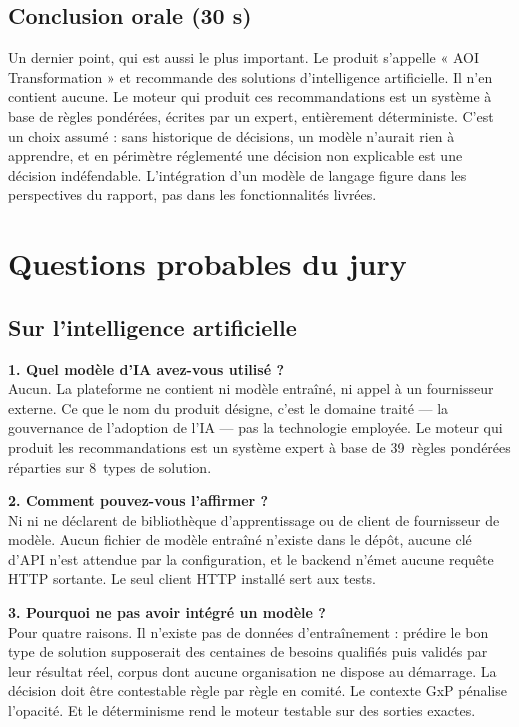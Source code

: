 \subsection*{Conclusion orale (30 s)}

\begin{oral}
Un dernier point, qui est aussi le plus important. Le produit s'appelle « AOI
Transformation » et recommande des solutions d'intelligence artificielle. Il n'en
contient aucune. Le moteur qui produit ces recommandations est un système à base de
règles pondérées, écrites par un expert, entièrement déterministe. C'est un choix
assumé : sans historique de décisions, un modèle n'aurait rien à apprendre, et en
périmètre réglementé une décision non explicable est une décision indéfendable.
L'intégration d'un modèle de langage figure dans les perspectives du rapport, pas dans
les fonctionnalités livrées.
\end{oral}

\section{Questions probables du jury}

\subsection*{Sur l'intelligence artificielle}

\textbf{1. Quel modèle d'IA avez-vous utilisé ?}\\
Aucun. La plateforme ne contient ni modèle entraîné, ni appel à un fournisseur externe.
Ce que le nom du produit désigne, c'est le domaine traité — la gouvernance de l'adoption
de l'IA — pas la technologie employée. Le moteur qui produit les recommandations est un
système expert à base de 39~règles pondérées réparties sur 8~types de solution.

\textbf{2. Comment pouvez-vous l'affirmer ?}\\
Ni  ni  ne déclarent de bibliothèque
d'apprentissage ou de client de fournisseur de modèle. Aucun fichier de modèle entraîné
n'existe dans le dépôt, aucune clé d'API n'est attendue par la configuration, et le
backend n'émet aucune requête HTTP sortante. Le seul client HTTP installé sert aux
tests.

\textbf{3. Pourquoi ne pas avoir intégré un modèle ?}\\
Pour quatre raisons. Il n'existe pas de données d'entraînement : prédire le bon type de
solution supposerait des centaines de besoins qualifiés puis validés par leur résultat
réel, corpus dont aucune organisation ne dispose au démarrage. La décision doit être
contestable règle par règle en comité. Le contexte GxP pénalise l'opacité. Et le
déterminisme rend le moteur testable sur des sorties exactes.

